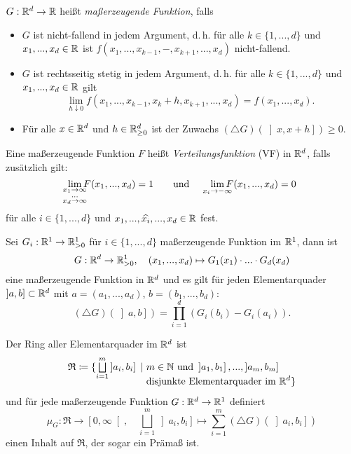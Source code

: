 \documentclass{cheat-sheet}
\newcommand{\Ring}{\mathfrak{R}} %
\begin{document}
\begin{defn}
  $G : \mathbb{R}^d \to \mathbb{R}$ heißt \emph{maßerzeugende Funktion}, falls
  \begin{itemize}
    \item $G$ ist nicht-fallend in jedem Argument, d.\,h. für alle $k \in \{ 1, ..., d \}$ und $x_1, ..., x_d \in \mathbb{R}$ ist $f(x_1, ..., x_{k-1}, -, x_{k+1}, ..., x_d)$ nicht-fallend.
    \item $G$ ist rechtsseitig stetig in jedem Argument, d.\,h. für alle $k \in \{ 1, ..., d \}$ und $x_1, ..., x_d \in \mathbb{R}$ gilt
    \[ \lim_{h \downarrow 0} f(x_1, ..., x_{k-1}, x_k + h, x_{k+1}, ..., x_d) = f(x_1, ..., x_d). \]
    \item Für alle $x \in \mathbb{R}^d$ und $h \in \mathbb{R}_{\geq 0}^d$ ist der Zuwachs $(\triangle G)(\left] x, x + h \right]) \geq 0$.
  \end{itemize}
\end{defn}


\begin{defn}
  Eine maßerzeugende Funktion $F$ heißt \emph{Verteilungsfunktion} (VF) in $\mathbb{R}^d$, falls zusätzlich gilt:
  \[
    \lim_{\mathclap{\substack{x_1 \to \infty \\ ... \\ x_d \to \infty}}} F(x_1, ..., x_d) = 1
    \qquad \text{und} \qquad
    \lim_{\mathclap{x_i \to -\infty}} F(x_1, ..., x_d) = 0
  \]
  für alle $i \in \{ 1, ..., d \}$ und $x_1, ..., \widehat{x_i}, ..., x_d \in \mathbb{R}$ fest.
\end{defn}

\begin{bem}
  Sei $G_i : \mathbb{R}^1 \to \mathbb{R}_{> 0}^1$ für $i \in \{ 1, ..., d \}$ maßerzeugende Funktion im $\mathbb{R}^1$, dann ist
  \[ G : \mathbb{R}^d \to \mathbb{R}_{>0}^1, \quad (x_1, ..., x_d) \mapsto G_1(x_1) \cdot ... \cdot G_d(x_d) \]
  eine maßerzeugende Funktion in $\mathbb{R}^d$ und es gilt für jeden Elementarquader $\left] a, b \right] \subset \mathbb{R}^d$ mit $a = (a_1, ..., a_d)$, $b = (b_1, ..., b_d)$:
  \[ (\triangle G)(\left] a, b \right]) = \prod_{i=1}^d \left( G_i(b_i) - G_i(a_i) \right). \]
\end{bem}

\begin{satz}
  Der Ring aller Elementarquader im $\mathbb{R}^d$ ist
  \begin{align*}
     \Ring \coloneqq \{ \bigsqcup_{i=1}^m \left] a_i, b_i \right] \,\mid\,\, & m \in \N \text{ und } \left] a_1, b_1 \right], ..., \left] a_m, b_m \right] \\[-8pt]
     & \text{disjunkte Elementarquader im } \R^d \}
  \end{align*}
  und für jede maßerzeugende Funktion $G : \mathbb{R}^d \to \mathbb{R}^1$ definiert
  \[ \mu_G : \Ring \to \left[ 0, \infty \right[, \quad \bigsqcup_{i=1}^m \left] a_i, b_i \right] \mapsto \sum_{i=1}^m (\triangle G)(\left] a_i, b_i \right]) \]
  einen Inhalt auf $\Ring$, der sogar ein Prämaß ist.
\end{satz}
\end{document}
